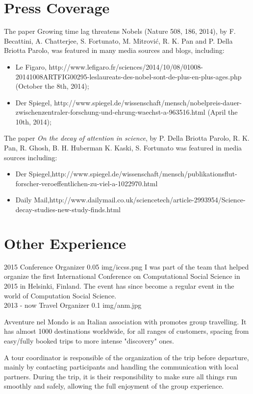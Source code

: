 \documentclass[]{friggeri-cv}
\begin{document}
\section{Press Coverage}

The paper Growing time lag threatens Nobels (Nature 508, 186, 2014), by F. Becattini, A.
Chatterjee, S. Fortunato, M. Mitrović, R. K. Pan and P. Della Briotta Parolo, was featured in many
media sources and blogs, including:

\begin{itemize}
\item Le Figaro, http://www.lefigaro.fr/sciences/2014/10/08/01008-20141008ARTFIG00295-leslaureats-des-nobel-sont-de-plus-en-plus-ages.php
(October the 8th, 2014);
\item Der Spiegel, http://www.spiegel.de/wissenschaft/mensch/nobelpreis-dauer-zwischenzentraler-forschung-und-ehrung-waechst-a-963516.html
(April the 10th, 2014);
\end{itemize}

The paper \textit{On the decay of attention in science}, by P. Della Briotta Parolo, R. K. Pan, R. Ghosh, B. H. Huberman
K. Kaski, S. Fortunato was featured in media sources including:
\begin{itemize}
\item Der Spiegel,​ http://www.spiegel.de/wissenschaft/mensch/publikationsflut-forscher-veroeffentlichen-zu-viel-a-1022970.html
\item Daily Mail, ​http://www.dailymail.co.uk/sciencetech/article-2993954/Science-decay-studies-new-study-finds.html​
\end{itemize}


\section{Other Experience}

\begin{entrylist}

\work
{2015}
{Conference Organizer}
{0.05}
{img/iccss.png}
{I was part of the team that helped organize the first International Conference on Computational Social Science in 2015 in Helsinki, Finland. The event has since become a regular event in the world of Computation Social Science.
}
\\

\work
{2013 - now}
{Travel Organizer}
{0.1}
{img/anm.jpg}
{Avventure nel Mondo is an Italian association with promotes group travelling. It has almost 1000 destinations worldwide, for all ranges of customers, spacing from easy/fully booked trips to more intense "discovery" ones.

A tour coordinator is responsible of the organization of the trip before departure, mainly by contacting participants and handling the communication with local partners. During the trip, it is their responsibility to make sure all things run smoothly and safely, allowing the full enjoyment of the group experience.}


\end{entrylist}
\end{document}
